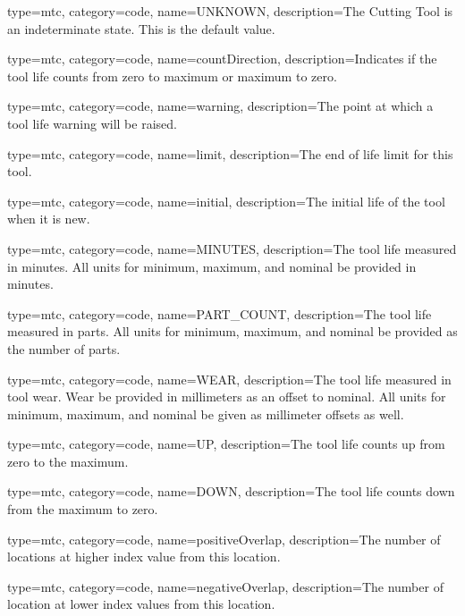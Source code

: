 {
  type=mtc,
  category=code,
  name={UNKNOWN},
  description={The Cutting Tool is an indeterminate state. This is the default value.}
}


{
  type=mtc,
  category=code,
  name={countDirection},
  description={Indicates if the tool life counts from zero to maximum or maximum to zero.}
}


{
  type=mtc,
  category=code,
  name={warning},
  description={The point at which a tool life warning will be raised.}
}


{
  type=mtc,
  category=code,
  name={limit},
  description={The end of life limit for this tool.}
}


{
  type=mtc,
  category=code,
  name={initial},
  description={The initial life of the tool when it is new.}
}


{
  type=mtc,
  category=code,
  name={MINUTES},
  description={The tool life measured in minutes. All units for minimum, maximum, and nominal \MUST be provided in minutes.}
}


{
  type=mtc,
  category=code,
  name={PART\_COUNT},
  description={The tool life measured in parts. All units for minimum, maximum, and nominal \MUST be provided as the number of parts.}
}


{
  type=mtc,
  category=code,
  name={WEAR},
  description={The tool life measured in tool wear. Wear \MUST be provided in millimeters as an offset to nominal. All units for minimum, maximum, and nominal \MUST be given as millimeter offsets as well. }
}


{
  type=mtc,
  category=code,
  name={UP},
  description={The tool life counts up from zero to the maximum.}
}


{
  type=mtc,
  category=code,
  name={DOWN},
  description={The tool life counts down from the maximum to zero.}
}


{
  type=mtc,
  category=code,
  name={positiveOverlap},
  description={The number of locations at higher index value from this location.}
}


{
  type=mtc,
  category=code,
  name={negativeOverlap},
  description={The number of location at lower index values from this location.}
}


